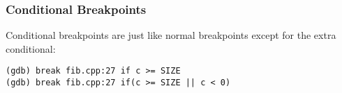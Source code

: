 \documentclass[11pt]{beamer}
\begin{document}
\begin{frame}[fragile]
\frametitle{Conditional Breakpoints}
Conditional breakpoints are just like normal breakpoints except for the extra conditional:
\begin{lstlisting}[style=BashInputStyle]
(gdb) break fib.cpp:27 if c >= SIZE
(gdb) break fib.cpp:27 if(c >= SIZE || c < 0)
\end{lstlisting}
\end{frame}
\end{document}
